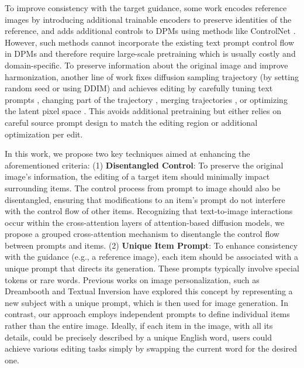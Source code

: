 To improve consistency with the target guidance, some work \cite{yang2023paint,chen2023anydoor, shen2023advancing,xue2022dccf} encodes reference images by introducing additional trainable encoders to preserve identities of the reference, and adds additional controls to DPMs using methods like ControlNet \cite{zhang2023adding}.
However, such methods cannot incorporate the existing text prompt control flow in DPMs and therefore require large-scale pretraining which is usually costly and domain-specific.
To preserve information about the original image and improve harmonization,
another line of work fixes diffusion sampling trajectory (by setting random seed or using DDIM) and achieves editing by carefully tuning text prompts \cite{mokady2023null,miyake2023negative}, changing part of the trajectory \cite{meng2021sdedit}, merging trajectories \cite{lu2023tf, wallace2023edict}, or optimizing the latent pixel space \cite{mou2023dragondiffusion, shi2023dragdiffusion}.
This avoids additional pretraining but either relies on careful source prompt design to match the editing region or additional optimization per edit.


In this work, we propose two key techniques aimed at enhancing the aforementioned criteria:
(1) \textbf{Disentangled Control}: To preserve the original image's information, the editing of a target item should minimally impact surrounding items. The control process from prompt to image should also be disentangled, ensuring that modifications to an item's prompt do not interfere with the control flow of other items. Recognizing that text-to-image interactions occur within the cross-attention layers of attention-based diffusion models, we propose a grouped cross-attention mechanism to disentangle the control flow between prompts and items.
(2) \textbf{Unique Item Prompt}: 
To enhance consistency with the guidance (e.g., a reference image), each item should be associated with a unique prompt that directs its generation. These prompts typically involve special tokens or rare words. Previous works on image personalization, such as Dreambooth \cite{ruiz2023dreambooth} and Textual Inversion \cite{gal2022image}  have explored this concept by representing a new subject with a unique prompt, which is then used for image generation.
In contrast, our approach employs independent prompts to define individual items rather than the entire image. Ideally, if each item in the image, with all its details, could be precisely described by a unique English word, users could achieve various editing tasks simply by swapping the current word for the desired one.

